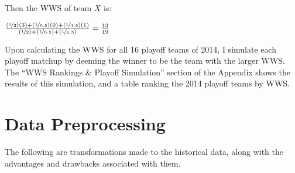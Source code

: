 \documentclass[a4paper,11pt]{article}
\begin{document}
Then the WWS of team $X$ is:

\begin{center}
$\frac{(\nicefrac{1}{2})(3) + (\nicefrac{1}{0.5})(0) + (\nicefrac{1}{1.5})(1)}{(\nicefrac{1}{2})+(\nicefrac{1}{0.5})+(\nicefrac{1}{1.5})} = \frac{13}{19}$
\end{center}

Upon calculating the WWS for all 16 playoff teams of 2014, I simulate each playoff matchup by deeming the winner to be the team with the larger WWS. The ``WWS Rankings \& Playoff Simulation'' section of the Appendix shows the results of this simulation, and a table ranking the 2014 playoff teams by WWS.

\section{Data Preprocessing}
The following are transformations made to the historical data, along with the advantages and drawbacks associated with them.
\end{document}
